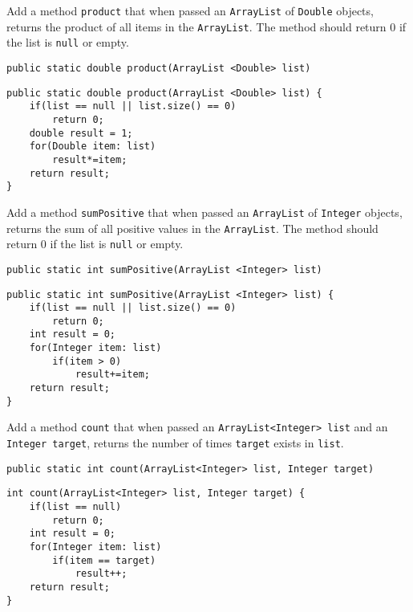 \begin{questions}
\question Add a method \texttt{product} that when passed an \texttt{ArrayList} of \texttt{Double} objects, returns the product of all items in the \texttt{ArrayList}. The method should return 0 if the list is \texttt{null} or empty.

\begin{lstlisting}
public static double product(ArrayList <Double> list)
\end{lstlisting}

\begin{solution}
\begin{lstlisting}
public static double product(ArrayList <Double> list) {
	if(list == null || list.size() == 0) 
		return 0;
	double result = 1;
	for(Double item: list)
		result*=item;
	return result;
}	
\end{lstlisting}	
\end{solution}


\question Add a method \texttt{sumPositive} that when passed an \texttt{ArrayList} of \texttt{Integer} objects, returns the sum of all positive values in the \texttt{ArrayList}. The method should return 0 if the list is \texttt{null} or empty.

\begin{lstlisting}
public static int sumPositive(ArrayList <Integer> list)
\end{lstlisting}

\begin{solution}
\begin{lstlisting}
public static int sumPositive(ArrayList <Integer> list) {
	if(list == null || list.size() == 0) 
		return 0;
	int result = 0;
	for(Integer item: list)
		if(item > 0)			
			result+=item;
	return result;
}	
\end{lstlisting}	
\end{solution}

\question Add a method \texttt{count} that when passed an \texttt{ArrayList<Integer> list} and an \texttt{Integer target}, returns the number of times \texttt{target} exists in \texttt{list}.

\begin{lstlisting}
public static int count(ArrayList<Integer> list, Integer target)
\end{lstlisting}

\begin{solution}
\begin{lstlisting}
int count(ArrayList<Integer> list, Integer target) {
	if(list == null)
		return 0;
	int result = 0;
	for(Integer item: list)
		if(item == target)
			result++;
	return result;
}
\end{lstlisting}
\end{solution}


\end{questions}

